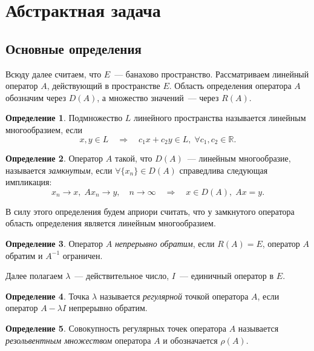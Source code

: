 \documentclass{article}
\theoremstyle{definition}
\newtheorem{definition}{Определение}
\begin{document}
\newpage

\section{Абстрактная задача}

\subsection{Основные определения}
Всюду далее считаем, что $E$~--- банахово пространство. Рассматриваем линейный оператор $A$, действующий в пространстве $E$.
Область определения оператора $A$ обозначим через $D(A)$, а множество значений~--- через $R(A)$.
\begin{definition} \label{linear manifold}
	Подмножество $L$ линейного пространства называется линейным многообразием, если
	\begin{equation*}
		x, y \in L \quad \Longrightarrow \quad c_1x + c_2y \in L, \; \forall c_1, c_2 \in \mathbb{R}.
	\end{equation*}
\end{definition}

\begin{definition} \label{closed operator}
	Оператор $A$ такой, что $ D(A) $~--- линейным многообразие,
	называется \textit{замкнутым}, если $\forall \{x_n\}  \in D(A)$ справедлива следующая импликация:
	\begin{equation*}
		x_n \rightarrow x, \; Ax_n \rightarrow y, \quad n \rightarrow \infty  \quad \Longrightarrow \quad x \in D(A), \; Ax = y. 
	\end{equation*}
\end{definition}

В силу этого определения будем априори считать, 
что у замкнутого оператора область определения является линейным многообразием.

\begin{definition}
	Оператор $A$ \textit{непрерывно обратим}, если $R(A) = E$, оператор $A$ обратим и $A^{-1}$ ограничен.
\end{definition}

	Далее полагаем $\lambda$~--- действительное число, $I$~--- единичный оператор в $E$.
	
\begin{definition}
	Точка $\lambda$ называется \textit{регулярной} точкой оператора $A$, если оператор $A - \lambda I$ непрерывно обратим.
\end{definition}

\begin{definition}
	Совокупность регулярных точек оператора $A$ называется \textit{резольвентным множеством} оператора $A$
	и обозначается $\rho(A)$.
\end{definition}
\end{document}
